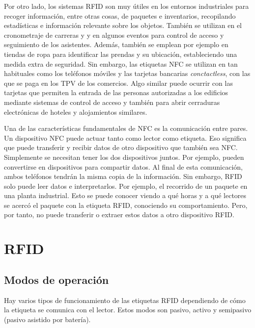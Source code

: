\documentclass[12pt,a4paper,onecolumn,oneside]{report}
\begin{document}
Por otro lado, los sistemas RFID son muy útiles en los entornos industriales para recoger información, entre otras cosas, de paquetes e inventarios, recopilando estadísticas e información relevante sobre los objetos. También se utilizan en el cronometraje de carreras y y en algunos eventos para control de acceso y seguimiento de los asistentes. Además, también se emplean por ejemplo en tiendas de ropa para identificar las prendas y su ubicación, estableciendo una medida extra de seguridad. Sin embargo, las etiquetas NFC se utilizan en tan habituales como los teléfonos móviles y las tarjetas bancarias \textit{conctactless}, con las que se paga en los TPV de los comercios. Algo similar puede ocurrir con las tarjetas que permiten la entrada de las personas autorizadas a los edificios mediante sistemas de control de acceso y también para abrir cerraduras electrónicas de hoteles y alojamientos similares.

Una de las características fundamentales de NFC es la comunicación entre pares. Un dispositivo NFC puede actuar tanto como lector como etiqueta. Eso significa que puede transferir y recibir datos de otro dispositivo que también sea NFC. Simplemente se necesitan tener los dos dispositivos juntos. Por ejemplo, pueden convertirse en dispositivos para compartir datos. Al final de esta comunicación, ambos teléfonos tendrán la misma copia de la información. Sin embargo, RFID solo puede leer datos e interpretarlos. Por ejemplo, el recorrido de un paquete en una planta industrial. Esto se puede conocer viendo a qué horas y a qué lectores se acercó el paquete con la etiqueta RFID, conociendo su comportamiento. Pero, por tanto, no puede transferir o extraer estos datos a otro dispositivo RFID.




\section{RFID}

\subsection{Modos de operación}

Hay varios tipos de funcionamiento de las etiquetas RFID dependiendo de cómo la etiqueta se comunica con el lector. Estos modos son pasivo, activo y semipasivo (pasivo asistido por batería).
\end{document}
